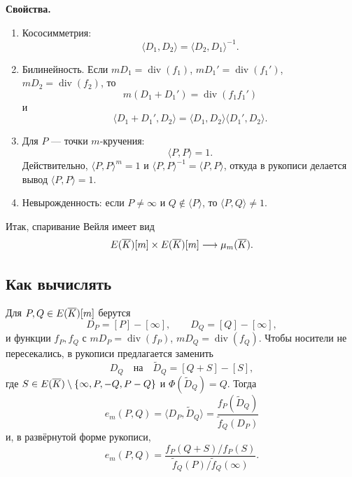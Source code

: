 \documentclass[12pt,a4paper]{article}
\begin{document}
\textbf{Свойства.}
\begin{enumerate}[label=\arabic*)]
\item Кососимметрия:
\[\langle D_1,D_2\rangle=\langle D_2,D_1\rangle^{-1}.\]
\item Билинейность. Если $mD_1=\operatorname{div}(f_1)$, $mD_1'=\operatorname{div}(f_1')$, $mD_2=\operatorname{div}(f_2)$, то
\[m(D_1+D_1')=\operatorname{div}(f_1f_1')\]
и
\[\langle D_1+D_1',D_2\rangle=\langle D_1,D_2\rangle\langle D_1',D_2\rangle.\]
\item Для $P$ --- точки $m$-кручения:
\[\langle P,P\rangle=1.\]
Действительно, $\langle P,P\rangle^m=1$ и $\langle P,P\rangle^{-1}=\langle P,P\rangle$, откуда в рукописи делается вывод $\langle P,P\rangle=1$.
\item Невырожденность: если $P\ne\infty$ и $Q\notin\langle P\rangle$, то $\langle P,Q\rangle\ne1$.
\end{enumerate}
Итак, спаривание Вейля имеет вид
\[E(\overline K)[m]\times E(\overline K)[m]\longrightarrow\mu_m(\overline K).\]

\subsection*{Как вычислять}
Для $P,Q\in E(\overline K)[m]$ берутся
\[D_P=[P]-[\infty],\qquad D_Q=[Q]-[\infty],\]
и функции $f_P,f_Q$ с $mD_P=\operatorname{div}(f_P)$, $mD_Q=\operatorname{div}(f_Q)$. Чтобы носители не пересекались, в рукописи предлагается заменить
\[D_Q\quad\text{на}\quad \widetilde D_Q=[Q+S]-[S],\]
где $S\in E(\overline K)\setminus\{\infty,P,-Q,P-Q\}$ и $\Phi(\widetilde D_Q)=Q$. Тогда
\[e_m(P,Q)=\langle D_P,\widetilde D_Q\rangle=\frac{f_P(\widetilde D_Q)}{\widetilde f_Q(D_P)}\]
и, в развёрнутой форме рукописи,
\[e_m(P,Q)=\frac{f_P(Q+S)/f_P(S)}{\widetilde f_Q(P)/\widetilde f_Q(\infty)}.\]
\end{document}
